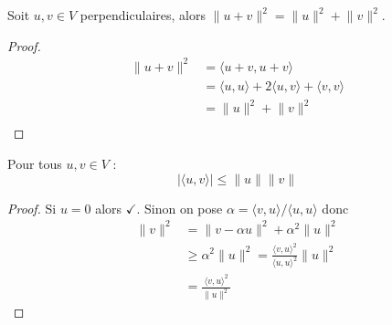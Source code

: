 \begin{theorem}[Pythagore]
Soit $u,v\in V$ perpendiculaires, alors $\lVert u+v \rVert^{2}=\lVert u \rVert^{2}+\lVert v \rVert^{2}$.
\end{theorem}
\begin{proof}
\begin{align*}
\lVert u+ v\rVert ^{2} & =\langle u+v,u+v \rangle   \\
 & =\langle u,u\rangle +2\langle u,v \rangle +\langle v,v \rangle  \\
  & =\lVert u \rVert ^{2}+\lVert v \rVert ^{2}  \\
\end{align*}
\end{proof}
\begin{theorem}
Pour tous $u,v\in V$ :
$$
	|\langle u,v \rangle |\le \lVert  u \rVert\lVert v \rVert  
$$
\end{theorem}
\begin{proof}
Si $u=0$ alors $\checkmark$. Sinon on pose $\alpha=\langle v,u \rangle/\langle u,u \rangle$ donc 
\begin{align*}
\lVert v \rVert ^{2} & =\lVert v-\alpha u  \rVert ^{2}+\alpha^{2}\lVert u \rVert ^{2} \\
 & \ge \alpha^{2}\lVert u \rVert ^{2}= \frac{\langle v,u  \rangle^{2} }{\langle u,u \rangle ^{2}} \lVert u \rVert ^{2} \\
 & =\frac{\langle v,u \rangle ^{2}}{\lVert u \rVert ^{2}}
\end{align*}
\end{proof}

